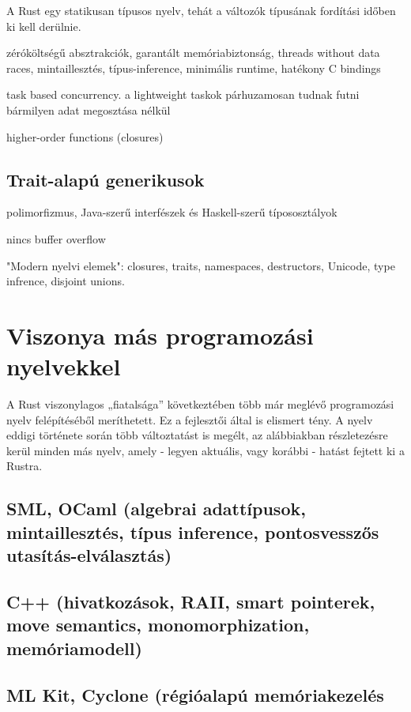 A Rust egy statikusan típusos nyelv, tehát a változók típusának fordítási időben ki kell derülnie.

zéróköltségű absztrakciók, garantált memóriabiztonság, threads without data races, mintaillesztés, típus-inference, minimális runtime, hatékony C bindings

task based concurrency. a lightweight taskok párhuzamosan tudnak futni bármilyen adat megosztása nélkül

higher-order functions (closures)

\subsection{Trait-alapú generikusok}

polimorfizmus, Java-szerű interfészek és Haskell-szerű típososztályok

nincs buffer overflow

"Modern nyelvi elemek": closures, traits, namespaces, destructors, Unicode, type infrence, disjoint unions.

\section{Viszonya más programozási nyelvekkel}
A Rust viszonylagos „fiatalsága” következtében több már meglévő programozási nyelv felépítéséből meríthetett. Ez a fejlesztői által is elismert %
tény. A nyelv eddigi története során több változtatást is megélt, az alábbiakban részletezésre kerül minden más nyelv, amely - legyen aktuális, vagy korábbi - hatást fejtett ki a Rustra.

\subsection{SML, OCaml (algebrai adattípusok, mintaillesztés, típus inference, pontosvesszős utasítás-elválasztás)}

\subsection{C++ (hivatkozások, RAII, smart pointerek, move semantics, monomorphization, memóriamodell)} 

\subsection{ML Kit, Cyclone (régióalapú memóriakezelés}

